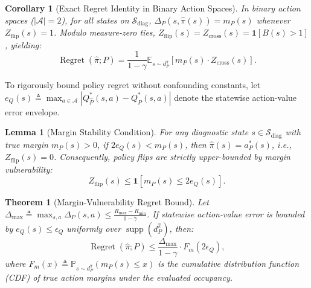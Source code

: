 \documentclass[journal,10pt,twocolumn]{IEEEtran}
\newtheorem{theorem}{Theorem}
\newtheorem{lemma}{Lemma}
\newtheorem{corollary}{Corollary}
\begin{document}
\begin{corollary}[Exact Regret Identity in Binary Action Spaces]
\label{cor:binary_regret_exact}
In binary action spaces ($|\mathcal{A}|=2$), for all states on $\mathcal{S}_{\mathrm{diag}}$, $\Delta_P(s, \hat{\pi}(s)) = m_P(s)$ whenever $Z_{\mathrm{flip}}(s) = 1$. Modulo measure-zero ties, $Z_{\mathrm{flip}}(s) = Z_{\mathrm{cross}}(s) = \mathbf{1}[B(s) > 1]$, yielding:
\begin{equation}
\operatorname{Regret}(\hat{\pi}; P) = \frac{1}{1-\gamma} \mathbb{E}_{s \sim d_P^{\hat{\pi}}} \left[ m_P(s) \cdot Z_{\mathrm{cross}}(s) \right].
\label{eq:binary_exact_regret}
\end{equation}
\end{corollary}

To rigorously bound policy regret without confounding constants, let $e_Q(s) \triangleq \max_{a \in \mathcal{A}} |Q_{\hat{P}}^*(s, a) - Q_P^*(s, a)|$ denote the statewise action-value error envelope.

\begin{lemma}[Margin Stability Condition]
\label{lem:margin_stability}
For any diagnostic state $s \in \mathcal{S}_{\mathrm{diag}}$ with true margin $m_P(s) > 0$, if $2 e_Q(s) < m_P(s)$, then $\hat{\pi}(s) = a_P^*(s)$, i.e., $Z_{\mathrm{flip}}(s) = 0$. Consequently, policy flips are strictly upper-bounded by margin vulnerability:
\begin{equation}
Z_{\mathrm{flip}}(s) \le \mathbf{1}\left[ m_P(s) \le 2 e_Q(s) \right].
\label{eq:flip_indicator_bound}
\end{equation}
\end{lemma}

\begin{theorem}[Margin-Vulnerability Regret Bound]
\label{thm:margin_cdf_bound}
Let $\Delta_{\max} \triangleq \max_{s, a} \Delta_P(s, a) \le \frac{R_{\max} - R_{\min}}{1-\gamma}$. If statewise action-value error is bounded by $e_Q(s) \le \epsilon_Q$ uniformly over $\operatorname{supp}(d_P^{\hat{\pi}})$, then:
\begin{equation}
\operatorname{Regret}(\hat{\pi}; P) \le \frac{\Delta_{\max}}{1-\gamma} \cdot F_m(2 \epsilon_Q),
\label{eq:cdf_margin_bound}
\end{equation}
where $F_m(x) \triangleq \mathbb{P}_{s \sim d_P^{\hat{\pi}}}(m_P(s) \le x)$ is the cumulative distribution function (CDF) of true action margins under the evaluated occupancy.
\end{theorem}
\end{document}

